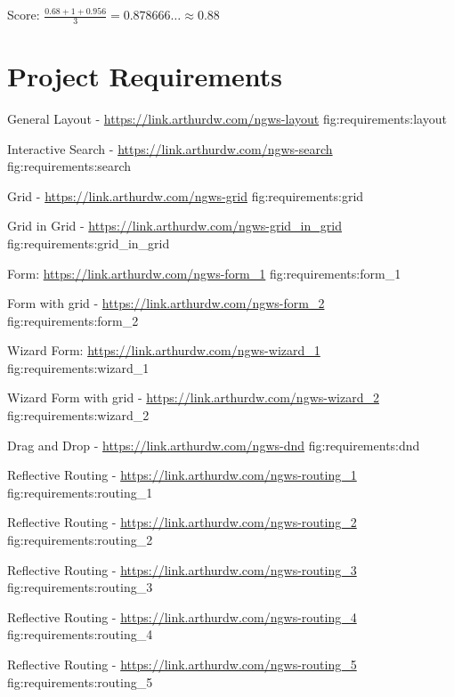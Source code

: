 Score: $\frac{0.68 + 1 + 0.956}{3} = 0.878666\dots \approx 0.88$

\chapter{Project Requirements}

{General Layout - \url{https://link.arthurdw.com/ngws-layout}}
{fig:requirements:layout}

{Interactive Search - \url{https://link.arthurdw.com/ngws-search}}
{fig:requirements:search}

{Grid - \url{https://link.arthurdw.com/ngws-grid}}
{fig:requirements:grid}

{Grid in Grid - \url{https://link.arthurdw.com/ngws-grid_in_grid}}
{fig:requirements:grid_in_grid}

{Form: \url{https://link.arthurdw.com/ngws-form_1}}
{fig:requirements:form_1}

{Form with grid - \url{https://link.arthurdw.com/ngws-form_2}}
{fig:requirements:form_2}

{Wizard Form: \url{https://link.arthurdw.com/ngws-wizard_1}}
{fig:requirements:wizard_1}

{Wizard Form with grid - \url{https://link.arthurdw.com/ngws-wizard_2}}
{fig:requirements:wizard_2}

{Drag and Drop - \url{https://link.arthurdw.com/ngws-dnd}}
{fig:requirements:dnd}

{Reflective Routing - \url{https://link.arthurdw.com/ngws-routing_1}}
{fig:requirements:routing_1}

{Reflective Routing - \url{https://link.arthurdw.com/ngws-routing_2}}
{fig:requirements:routing_2}

{Reflective Routing - \url{https://link.arthurdw.com/ngws-routing_3}}
{fig:requirements:routing_3}

{Reflective Routing - \url{https://link.arthurdw.com/ngws-routing_4}}
{fig:requirements:routing_4}

{Reflective Routing - \url{https://link.arthurdw.com/ngws-routing_5}}
{fig:requirements:routing_5}

